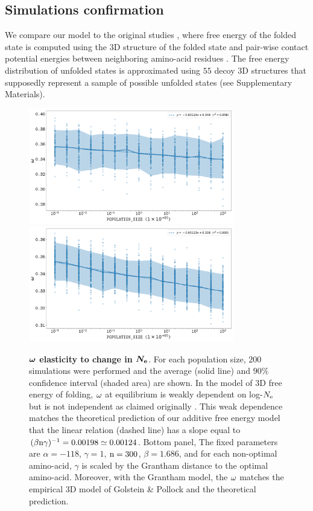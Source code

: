 \documentclass{article}
\begin{document}
\subsection*{Simulations confirmation}
We compare our model to the original studies \cite{Williams2006, Goldstein2011, Pollock2012}, where free energy of the folded state is computed using the $3$D structure of the folded state and pair-wise contact potential energies between neighboring amino-acid residues \cite{Miyazawa1985}.
The free energy distribution of unfolded states is approximated using $55$ decoy $3$D structures that supposedly represent a sample of possible unfolded states (see Supplementary Materials).

\begin{figure}[htb!]
\begin{mdframed}
\centering
\includegraphics[width=0.8\textwidth] {artworks/SimuFold-Elasticity.pdf}
\includegraphics[width=0.8\textwidth] {artworks/SimuStab-Grantham-Elasticity.pdf}
	\caption{
		\textbf{$\bm{\omega}$ elasticity to change in $\bm{N_{\mathrm{e}}}$}.
		For each population size, $200$ simulations were performed and the average (solid line) and $90\%$ confidence interval (shaded area) are shown.
		In the model of 3D free energy of folding, $\omega$ at equilibrium is weakly dependent on log-$N_{\mathrm{e}}$ but is not independent as claimed originally \cite{Goldstein2013}.
		This weak dependence matches the theoretical prediction of our additive free energy model that the linear relation (dashed line) has a slope equal to $(\beta  \text{n} \gamma)^{-1} = 0.00198 \simeq 0.00124$.
		Bottom panel, The fixed parameters are $\alpha=-118$, $\gamma=1$, $\text{n}=300$, $\beta=1.686$, and for each non-optimal amino-acid, $\gamma$ is scaled by the Grantham distance to the optimal amino-acid.
		Moreover, with the Grantham model, the $\omega$ matches the empirical 3D model of Golstein \& Pollock and the theoretical prediction.
		\label{fig:GoldsteinVsToy}
	}
\end{mdframed}
\end{figure}
\end{document}
